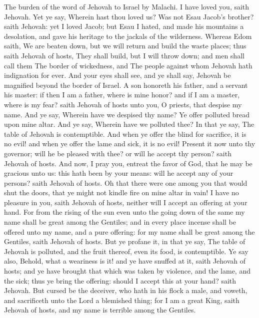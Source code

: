 


The burden of the word of Jehovah to Israel by Malachi.  I have loved you, saith Jehovah. Yet ye say, Wherein hast thou loved us? Was not Esau Jacob’s brother? saith Jehovah: yet I loved Jacob; but Esau I hated, and made his mountains a desolation, and gave his heritage to the jackals of the wilderness. Whereas Edom saith, We are beaten down, but we will return and build the waste places; thus saith Jehovah of hosts, They shall build, but I will throw down; and men shall call them The border of wickedness, and The people against whom Jehovah hath indignation for ever. And your eyes shall see, and ye shall say, Jehovah be magnified beyond the border of Israel.  A son honoreth his father, and a servant his master: if then I am a father, where is mine honor? and if I am a master, where is my fear? saith Jehovah of hosts unto you, O priests, that despise my name. And ye say, Wherein have we despised thy name? Ye offer polluted bread upon mine altar. And ye say, Wherein have we polluted thee? In that ye say, The table of Jehovah is contemptible. And when ye offer the blind for sacrifice, it is no evil! and when ye offer the lame and sick, it is no evil! Present it now unto thy governor; will he be pleased with thee? or will he accept thy person? saith Jehovah of hosts. And now, I pray you, entreat the favor of God, that he may be gracious unto us: this hath been by your means: will he accept any of your persons? saith Jehovah of hosts. Oh that there were one among you that would shut the doors, that ye might not kindle fire on mine altar in vain! I have no pleasure in you, saith Jehovah of hosts, neither will I accept an offering at your hand. For from the rising of the sun even unto the going down of the same my name shall be great among the Gentiles; and in every place incense shall be offered unto my name, and a pure offering: for my name shall be great among the Gentiles, saith Jehovah of hosts. But ye profane it, in that ye say, The table of Jehovah is polluted, and the fruit thereof, even its food, is contemptible. Ye say also, Behold, what a weariness is it! and ye have snuffed at it, saith Jehovah of hosts; and ye have brought that which was taken by violence, and the lame, and the sick; thus ye bring the offering: should I accept this at your hand? saith Jehovah. But cursed be the deceiver, who hath in his flock a male, and voweth, and sacrificeth unto the Lord a blemished thing; for I am a great King, saith Jehovah of hosts, and my name is terrible among the Gentiles. 

